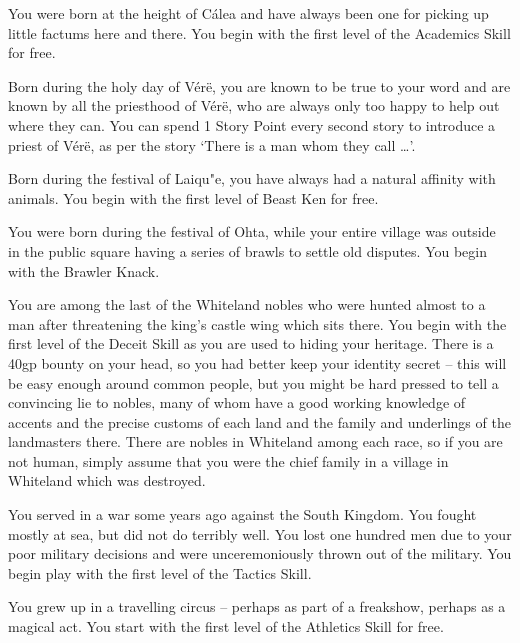 \begin{list}{\addtocounter{list}{1}\textbf{:}}{\raggedleft}
\item{You were born at the height of C\'{a}lea and have always been one for picking up little factums here and there.  You begin with the first level of the Academics Skill for free.}

\item{Born during the holy day of V\'{e}r\"{e}, you are known to be true to your word and are known by all the priesthood of V\'{e}r\"{e}, who are always only too happy to help out where they can.  You can spend 1 Story Point every second story to introduce a priest of V\'{e}r\"{e}, as per the story `There is a man whom they call \ldots'.}

\item{Born during the festival of Laiqu"{e}, you have always had a natural affinity with animals.  You begin with the first level of Beast Ken for free.}

\item{You were born during the festival of Ohta, while your entire village was outside in the public square having a series of brawls to settle old disputes.  You begin with the Brawler Knack.}

\item{You are among the last of the Whiteland nobles who were hunted almost to a man after threatening the king's castle wing which sits there.  You begin with the first level of the Deceit Skill as you are used to hiding your heritage.  There is a 40gp bounty on your head, so you had better keep your identity secret -- this will be easy enough around common people, but you might be hard pressed to tell a convincing lie to nobles, many of whom have a good working knowledge of accents and the precise customs of each land and the family and underlings of the landmasters there.  There are nobles in Whiteland among each race, so if you are not human, simply assume that you were the chief family in a village in Whiteland which was destroyed.}

\item{You served in a war some years ago against the South Kingdom.  You fought mostly at sea, but did not do terribly well.  You lost one hundred men due to your poor military decisions and were unceremoniously thrown out of the military.  You begin play with the first level of the Tactics Skill.}

\item{You grew up in a travelling circus -- perhaps as part of a freakshow, perhaps as a magical act.  You start with the first level of the Athletics Skill for free.}


\end{list}
